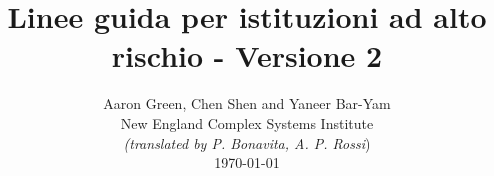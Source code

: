 \documentclass[onecolumn,journal]{IEEEtran}
\begin{document}
\title{\color{Brown} Linee guida per istituzioni ad alto rischio - Versione 2 \\
\vspace{-0.35ex}}
\author{Aaron Green, Chen Shen and Yaneer Bar-Yam \\ New England Complex Systems Institute \\
\vspace{+0.35ex}
\small{\textit{(translated by P. Bonavita, A. P. Rossi})}\\
 \today
  \vspace{-14ex} \\


\bigskip
\bigskip

\textbf{}
 }

\maketitle


\flushbottom %



\thispagestyle{empty} %




\renewcommand{\thefootnote}{\fnsymbol{footnote}}
\end{document}
